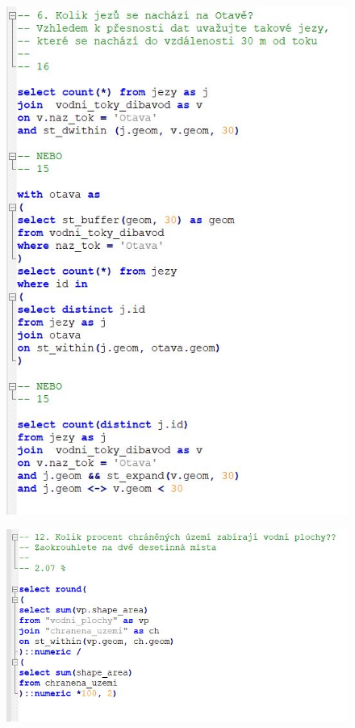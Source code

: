 \documentclass[a4paper, 12pt]{article}
\begin{document}
\clearpage

\begin{figure}[h!]
	\centering
	\includegraphics[width=15cm]{pictures/pd2.jpg}
\end{figure}

\begin{figure}[h!]
	\centering
	\includegraphics[width=15cm]{pictures/pd4.jpg}
\end{figure}
\end{document}
